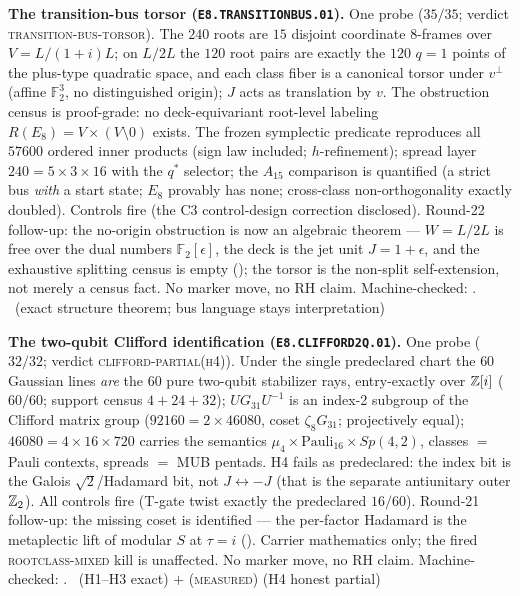 
\par\smallskip\noindent\textbf{The transition-bus torsor
(\texttt{E8.TRANSITIONBUS.01}).}
One probe ($35/35$; verdict \textsc{transition-bus-torsor}).  The
$240$ roots are $15$ disjoint coordinate $8$-frames over
$V=L/(1{+}i)L$; on $L/2L$ the $120$ root pairs are exactly the
$120$ $q=1$ points of the plus-type quadratic space, and each class
fiber is a canonical torsor under $v^\perp$ (affine $\mathbb F_2^3$,
no distinguished origin); $J$ acts as translation by $v$.  The
obstruction census is proof-grade: no deck-equivariant root-level
labeling $R(E_8)=V\times(V\setminus0)$ exists.  The frozen
symplectic predicate reproduces all $57600$ ordered inner products
(sign law included; $h$-refinement); spread layer
$240=5\times3\times16$ with the $q^{*}$ selector; the $A_{15}$
comparison is quantified (a strict bus \emph{with} a start state;
$E_8$ provably has none; cross-class non-orthogonality exactly
doubled).  Controls fire (the C3 control-design correction
disclosed).  Round-22 follow-up: the no-origin obstruction is now
an algebraic theorem --- $W=L/2L$ is free over the dual numbers
$\mathbb F_2[\epsilon]$, the deck is the jet unit $J=1{+}\epsilon$,
and the exhaustive splitting census is empty
(); the torsor is the
non-split self-extension, not merely a census fact.  No marker
move, no RH claim.
Machine-checked: .
\mE\ (exact structure theorem; bus language stays interpretation)
\par\smallskip

\par\smallskip\noindent\textbf{The two-qubit Clifford identification
(\texttt{E8.CLIFFORD2Q.01}).}
One probe ($32/32$; verdict \textsc{clifford-partial(h4)}).  Under
the single predeclared chart the $60$ Gaussian lines \emph{are} the
$60$ pure two-qubit stabilizer rays, entry-exactly over $\mathbb{Z}[i]$
($60/60$; support census $4+24+32$); $UG_{31}U^{-1}$ is an index-2
subgroup of the Clifford matrix group ($92160=2\times46080$, coset
$\zeta_8G_{31}$; projectively equal); $46080=4\times16\times720$
carries the semantics $\mu_4\times\mathrm{Pauli}_{16}\times
Sp(4,2)$, classes $=$ Pauli contexts, spreads $=$ MUB pentads.  H4
fails as predeclared: the index bit is the Galois
$\sqrt2$/Hadamard bit, not $J\leftrightarrow-J$ (that is the
separate antiunitary outer $\mathbb{Z}_2$).  All controls fire (T-gate
twist exactly the predeclared $16/60$).  Round-21 follow-up: the
missing coset is identified --- the per-factor Hadamard is the
metaplectic lift of modular $S$ at $\tau=i$
().  Carrier mathematics
only; the fired \textsc{rootclass-mixed} kill is unaffected.  No
marker move, no RH claim.
Machine-checked: .
\mE\ (H1--H3 exact) $+$ (\textsc{measured}) (H4 honest partial)
\par\smallskip

